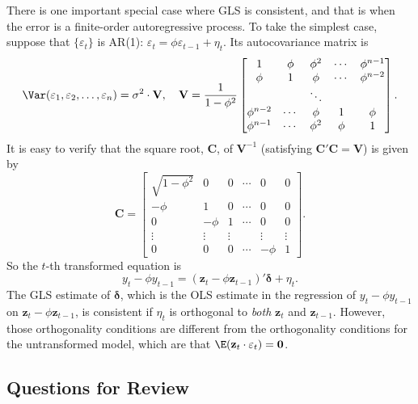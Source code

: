 There is one important special case where GLS is consistent, and that is when
the error is a finite-order autoregressive process. To take the simplest case, suppose
that $\{\varepsilon_t\}$ is AR(1): $\varepsilon_t = \phi \varepsilon_{t-1} + \eta_t$. Its autocovariance matrix is
\[
  \Var(\varepsilon_1, \varepsilon_2, \ldots, \varepsilon_n) = \sigma^2 \cdot \mathbf{V}, \quad
  \mathbf{V} = \frac{1}{1 - \phi^2}
  \begin{bmatrix}
    1 & \phi & \phi^2 & \cdots & \phi^{n-1} \\
    \phi & 1 & \phi & \cdots & \phi^{n-2} \\
    & & \ddots & & \\
    \phi^{n-2} & \cdots & \phi & 1 & \phi \\
    \phi^{n-1} & \cdots & \phi^2 & \phi & 1
  \end{bmatrix}.
\]
It is easy to verify that the square root, $\mathbf{C}$, of $\mathbf{V}^{-1}$ (satisfying $\mathbf{C}'\mathbf{C} = \mathbf{V}$) is given by
\begin{equation}
  \mathbf{C} =
  \begin{bmatrix}
    \sqrt{1 - \phi^2} & 0 & 0 & \cdots & 0 & 0 \\
    -\phi & 1 & 0 & \cdots & 0 & 0 \\
    0 & -\phi & 1 & \cdots & 0 & 0 \\
    \vdots & \vdots & \vdots & & \vdots & \vdots \\
    0 & 0 & 0 & \cdots & -\phi & 1
  \end{bmatrix}.
  \label{eq:6.7.13}
\end{equation}
So the $t$-th transformed equation is
\begin{equation}
  y_t - \phi y_{t-1} = (\mathbf{z}_t - \phi \mathbf{z}_{t-1})' \bm{\delta} + \eta_t.
  \label{eq:6.7.14}
\end{equation}
The GLS estimate of $\bm{\delta}$, which is the OLS estimate in the regression of $y_t - \phi y_{t-1}$
on $\mathbf{z}_t - \phi \mathbf{z}_{t-1}$, is consistent if $\eta_t$ is orthogonal to \emph{both} $\mathbf{z}_t$ and $\mathbf{z}_{t-1}$. However, those
orthogonality conditions are different from the orthogonality conditions for the
untransformed model, which are that $\E(\mathbf{z}_t \cdot \varepsilon_t) = \mathbf{0}$.

\subsection*{Questions for Review}

